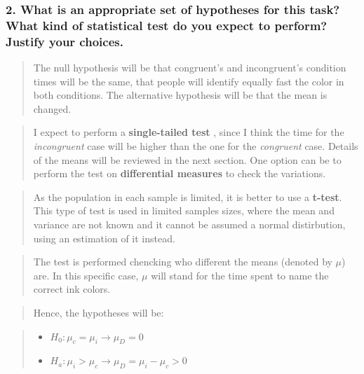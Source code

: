 \documentclass[]{article}
\providecommand{\tightlist}{%
  \setlength{\itemsep}{0pt}\setlength{\parskip}{0pt}}
\begin{document}
\subsubsection{2. What is an appropriate set of hypotheses for this
task? What kind of statistical test do you expect to perform? Justify
your
choices.}\label{what-is-an-appropriate-set-of-hypotheses-for-this-task-what-kind-of-statistical-test-do-you-expect-to-perform-justify-your-choices.}

\begin{quote}
The null hypothesis will be that congruent's and incongruent's condition
times will be the same, that people will identify equally fast the color
in both conditions. The alternative hypothesis will be that the mean is
changed.
\end{quote}

\begin{quote}
I expect to perform a \textbf{single-tailed test} , since I think the
time for the \emph{incongruent} case will be higher than the one for the
\emph{congruent} case. Details of the means will be reviewed in the next
section. One option can be to perform the test on \textbf{differential
measures} to check the variations.
\end{quote}

\begin{quote}
As the population in each sample is limited, it is better to use a
\textbf{t-test}. This type of test is used in limited samples sizes,
where the mean and variance are not known and it cannot be assumed a
normal distirbution, using an estimation of it instead.
\end{quote}

\begin{quote}
The test is performed chencking who different the means (denoted by
\(\mu\)) are. In this specific case, \(\mu\) will stand for the time
spent to name the correct ink colors.
\end{quote}

\begin{quote}
Hence, the hypotheses will be:
\end{quote}

\begin{quote}
\begin{itemize}
\tightlist
\item
  \(H_0 : \mu_{c} = \mu_{i} \rightarrow \mu_D =0\)
\item
  \(H_a : \mu_{i} > \mu_{c} \rightarrow \mu_D = \mu_{i} - \mu_{c} > 0\)
\end{itemize}
\end{quote}
\end{document}
